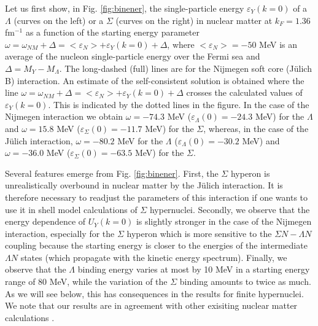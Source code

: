 Let us first show, in Fig. \ref{fig:binener}, the
single-particle energy $\varepsilon_Y(k=0)$ of
a $\Lambda$ (curves on the left) or a $\Sigma$ (curves on the right)
in nuclear matter at $k_F=1.36$ fm$^{-1}$ as a function of the starting
energy parameter $\omega=\omega_{NM}+\Delta = <\varepsilon_N> + \varepsilon_Y(k=0) +
\Delta$, 
where $<\varepsilon_N>=-50$
MeV is an average of
the nucleon single-particle energy over the Fermi sea and
$\Delta=M_Y-M_\Lambda$.
The long-dashed (full) lines are for the Nijmegen soft core (J\"ulich B)
interaction. An estimate of the
self-consistent solution is obtained where the line 
$\omega=\omega_{NM}+\Delta = <\varepsilon_N> + \varepsilon_Y(k=0) +
\Delta$ crosses the calculated values of $\varepsilon_Y(k=0)$. This is indicated by
the dotted lines in the figure.
In the case of the Nijmegen interaction we obtain  
$\omega=-74.3$ MeV ($\varepsilon_\Lambda(0)=-24.3$ MeV) for the
$\Lambda$ and $\omega=15.8$ MeV ($\varepsilon_\Sigma(0)=-11.7$ MeV) for the
$\Sigma$, 
whereas, in the case
of the J\"ulich interaction,  $\omega=-80.2$ MeV for the
$\Lambda$ ($\varepsilon_\Lambda(0)=-30.2$ MeV) and $\omega=-36.0$ MeV 
($\varepsilon_\Sigma(0)=-63.5$ MeV) for the $\Sigma$.

Several features emerge from Fig. \ref{fig:binener}. First,
the $\Sigma$ hyperon is unrealistically overbound in nuclear matter 
by the J\"ulich
interaction. It is therefore necessary to readjust the parameters
of this interaction if
one wants to use it in shell model calculations of $\Sigma$
hypernuclei.
Secondly, we observe that the energy dependence of $U_Y(k=0)$ is
slightly stronger in the case of the Nijmegen interaction, especially
for the $\Sigma$ hyperon which is more sensitive to the
$\Sigma N - \Lambda N$ coupling
because the starting energy is closer to the energies of the
intermediate $\Lambda N$ states (which propagate with the kinetic energy
spectrum). Finally, we observe that the $\Lambda$ binding energy 
varies at most by 10 MeV in a starting energy range of 80 MeV,
while the variation of the $\Sigma$ binding
amounts to twice as much. As we will see below, this has consequences
in the results for finite hypernuclei. We note that our
results are in agreement with other exisiting nuclear matter
calculations \cite{yama85,yama90,yama92,yama94,schulze}.

